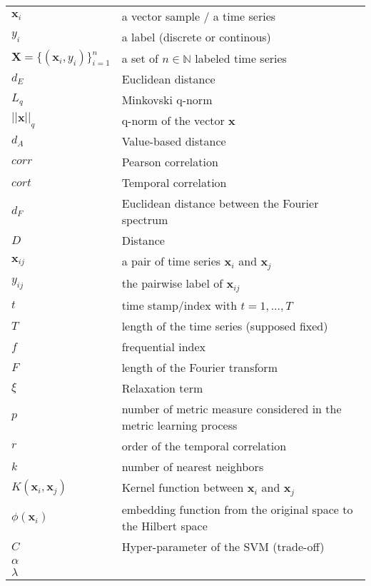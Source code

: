 \begin{tabular}{ll}
	$\textbf{x}_i$ 							& a vector sample / a time series \\ 
	$y_i$ 									& a label (discrete or continous) \\
	$\textbf{X} = \{(\textbf{x}_i , y_i)\}_{i=1}^n$ & a set of $n \in \mathbb{N}$ labeled time series \\
	$d_E$		& Euclidean distance \\
	$L_q$		& Minkovski q-norm \\
	$||\textbf{x}||_q$	& q-norm of the vector $\textbf{x}$ \\
	$d_A$		& Value-based distance \\
	$corr$  	& Pearson correlation \\
	$cort$  	& Temporal correlation \\
	$d_F$   	& Euclidean distance between the Fourier spectrum \\
	$D$ 		& Distance \\
	$\textbf{x}_{ij}$ 	& a pair of time series $\textbf{x}_i$ and $\textbf{x}_j$ \\
	$y_{ij}$			& the pairwise label of $\textbf{x}_{ij}$ \\
	$t$			& time stamp/index with $t=1,...,T$ \\
	$T$			& length of the time series (supposed fixed) \\
	$f$			& frequential index \\	
	$F$			& length of the Fourier transform \\
	$\xi$		& Relaxation term \\
	$p$			& number of metric measure considered in the metric learning 	process \\
	$r$			& order of the temporal correlation \\
	$k$			& number of nearest neighbors \\
	$K(\textbf{x}_i,\textbf{x}_j)$ & Kernel function between $\textbf{x}_i$ and $\textbf{x}_j$ \\
	$\phi(\textbf{x}_i)$ & embedding function from the original space to the Hilbert space  \\
	$C$ 		& Hyper-parameter of the SVM (trade-off)\\ 
	$\alpha$	& \\
	$\lambda$	& \\
\end{tabular} 




